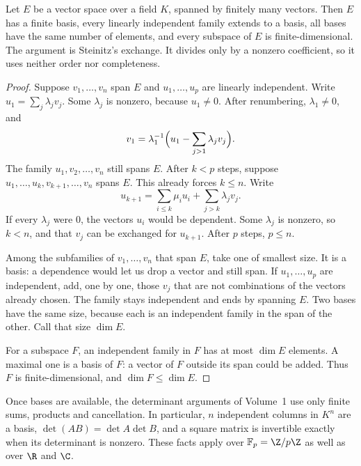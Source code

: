 \begin{lemmax}\label{lem:anyfield}
Let $E$ be a vector space over a field $K$, spanned by finitely many vectors. Then $E$ has a finite basis, every linearly independent family extends to a basis, all bases have the same number of elements, and every subspace of $E$ is finite-dimensional. The argument is Steinitz's exchange. It divides only by a nonzero coefficient, so it uses neither order nor completeness.
\end{lemmax}
\begin{proof}
Suppose $v_1,\dots,v_n$ span $E$ and $u_1,\dots,u_p$ are linearly independent. Write $u_1=\sum_j\lambda_jv_j$. Some $\lambda_j$ is nonzero, because $u_1\ne0$. After renumbering, $\lambda_1\ne0$, and
\[
v_1=\lambda_1^{-1}\Bigl(u_1-\sum_{j>1}\lambda_jv_j\Bigr).
\]
The family $u_1,v_2,\dots,v_n$ still spans $E$. After $k<p$ steps, suppose $u_1,\dots,u_k,v_{k+1},\dots,v_n$ spans $E$. This already forces $k\le n$. Write
\[
u_{k+1}=\sum_{i\le k}\mu_iu_i+\sum_{j>k}\lambda_jv_j.
\]
If every $\lambda_j$ were $0$, the vectors $u_i$ would be dependent. Some $\lambda_j$ is nonzero, so $k<n$, and that $v_j$ can be exchanged for $u_{k+1}$. After $p$ steps, $p\le n$.

Among the subfamilies of $v_1,\dots,v_n$ that span $E$, take one of smallest size. It is a basis: a dependence would let us drop a vector and still span. If $u_1,\dots,u_p$ are independent, add, one by one, those $v_j$ that are not combinations of the vectors already chosen. The family stays independent and ends by spanning $E$. Two bases have the same size, because each is an independent family in the span of the other. Call that size $\dim E$.

For a subspace $F$, an independent family in $F$ has at most $\dim E$ elements. A maximal one is a basis of $F$: a vector of $F$ outside its span could be added. Thus $F$ is finite-dimensional, and $\dim F\le\dim E$.
\end{proof}

Once bases are available, the determinant arguments of Volume~1 use only finite sums, products and cancellation. In particular, $n$ independent columns in $K^n$ are a basis, $\det(AB)=\det A\det B$, and a square matrix is invertible exactly when its determinant is nonzero. These facts apply over $\mathbb F_p=\Z/p\Z$ as well as over $\R$ and $\C$.

